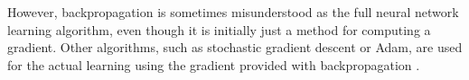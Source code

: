 However, backpropagation is sometimes misunderstood as the full neural network learning algorithm, even though it is initially just a method for computing a gradient. Other algorithms, such as stochastic gradient descent or Adam, are used for the actual learning using the gradient provided with backpropagation \cite{Goodfellow-et-al-2016}.






